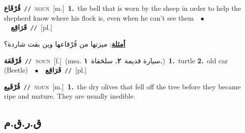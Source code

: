 \documentclass[10pt,a4paper,twoside]{article} %
\begin{document}
\begin{multicols}{2}
{\setlength\topsep{0pt}\textbf{\foreignlanguage{arabic}{قُرْقَاع}}\ {\color{gray}\texttt{//}\color{black}}\ \textsc{noun}\ [m.]\ \textbf{1.}~the bell that is worn by the sheep in order to help the shepherd know where his flock is, even when he can't see them\ \ $\bullet$\ \ \setlength\topsep{0pt}\textbf{\foreignlanguage{arabic}{قَرَاقِع}}\ {\color{gray}\texttt{//}\color{black}}\ [pl.]\  \begin{flushright}\color{gray}\foreignlanguage{arabic}{\textbf{\underline{\foreignlanguage{arabic}{أمثلة}}}: ميزتها من قُرْقاعها وين بقت شاردة؟}\end{flushright}\color{black}} \vspace{2mm}

{\setlength\topsep{0pt}\textbf{\foreignlanguage{arabic}{قُرْقَعَة}}\ {\color{gray}\texttt{//}\color{black}}\ \textsc{noun}\ [f.]\ \color{gray}(msa. \foreignlanguage{arabic}{سيارة قديمة}~\foreignlanguage{arabic}{\textbf{٢.}}  \foreignlanguage{arabic}{سلحَفاة}~\foreignlanguage{arabic}{\textbf{١.}})\color{black}\ \textbf{1.}~turtle  \textbf{2.}~old car (Beetle)\ \ $\bullet$\ \ \setlength\topsep{0pt}\textbf{\foreignlanguage{arabic}{قَرَاقِع}}\ {\color{gray}\texttt{//}\color{black}}\ [pl.]\ } \vspace{2mm}

{\setlength\topsep{0pt}\textbf{\foreignlanguage{arabic}{قُرْقَيع}}\ {\color{gray}\texttt{//}\color{black}}\ \textsc{noun}\ [m.]\ \textbf{1.}~the dry olives that fell off the tree before they became ripe and mature. They are usually inedible.\ } \vspace{2mm}

\vspace{-3mm}
\subsection*{\color{blue}\foreignlanguage{arabic}{ق.ر.ق.م}\color{blue}{}} 


\end{multicols}
\end{document}
